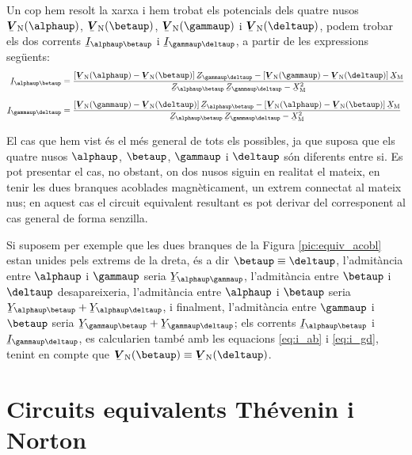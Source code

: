 Un cop hem resolt la xarxa i hem trobat els potencials dels quatre
nusos $\mcmplx{V}\ped{N}(\alphaup)$, $\mcmplx{V}\ped{N}(\betaup)$,
$\mcmplx{V}\ped{N}(\gammaup)$ i $\mcmplx{V}\ped{N}(\deltaup)$, podem
trobar els dos corrents $\cmplx{I}_{\alphaup\betaup}$ i
$\cmplx{I}_{\gammaup\deltaup}$, a partir de les expressions següents:
\begin{subequations}
\begin{align}
    \cmplx{I}_{\alphaup\betaup} &=  \frac{[\mcmplx{V}\ped{N}(\alphaup) - \mcmplx{V}\ped{N}(\betaup)] \, \cmplx{Z}_{\gammaup\deltaup} - [\mcmplx{V}\ped{N}(\gammaup) - \mcmplx{V}\ped{N}(\deltaup)] \,
    \cmplx{X}\ped{M}}{\cmplx{Z}_{\alphaup\betaup}\,
    \cmplx{Z}_{\gammaup\deltaup}-\cmplx{X}\ped{M}^2} \label{eq:i_ab}
    \\[1.5ex]
    \cmplx{I}_{\gammaup\deltaup} &= \frac{[\mcmplx{V}\ped{N}(\gammaup) - \mcmplx{V}\ped{N}(\deltaup)] \, \cmplx{Z}_{\alphaup\betaup} - [\mcmplx{V}\ped{N}(\alphaup) - \mcmplx{V}\ped{N}(\betaup)] \,
    \cmplx{X}\ped{M}}{\cmplx{Z}_{\alphaup\betaup}\,
    \cmplx{Z}_{\gammaup\deltaup}-\cmplx{X}\ped{M}^2} \label{eq:i_gd}
\end{align}
\end{subequations}

El cas que hem vist  és el més general de tots els
possibles, ja que suposa que els quatre nusos $\alphaup$, $\betaup$,
$\gammaup$ i $\deltaup$ són diferents entre si. Es pot presentar el cas,
no obstant, on dos nusos siguin en realitat el mateix, en tenir les
dues branques acoblades magnèticament, un extrem connectat al mateix
nus; en aquest cas el circuit equivalent resultant es pot derivar
del corresponent al cas general de forma senzilla.

Si suposem per exemple que les dues branques de la Figura
\vref{pic:equiv_acobl} estan unides pels extrems de la dreta,
és a dir $\betaup\equiv\deltaup$, l'admitància entre
$\alphaup$ i $\gammaup$ seria $\cmplx{Y}_{\alphaup\gammaup}$, l'admitància
entre $\betaup$ i $\deltaup$ desapareixeria, l'admitància entre $\alphaup$
i $\betaup$ seria $\cmplx{Y}_{\alphaup\betaup} +
\cmplx{Y}_{\alphaup\deltaup}$, i finalment, l'admitància entre $\gammaup$
i $\betaup$ seria $\cmplx{Y}_{\gammaup\betaup} +
\cmplx{Y}_{\gammaup\deltaup}$; els corrents $\cmplx{I}_{\alphaup\betaup}$ i
$\cmplx{I}_{\gammaup\deltaup}$, es calcularien també amb les equacions
\eqref{eq:i_ab} i \eqref{eq:i_gd}, tenint en compte que
$\mcmplx{V}\ped{N}(\betaup)\equiv\mcmplx{V}\ped{N}(\deltaup)$.

\section{Circuits equivalents Thévenin i Norton}   \label{sec:xarxes_Zth}

